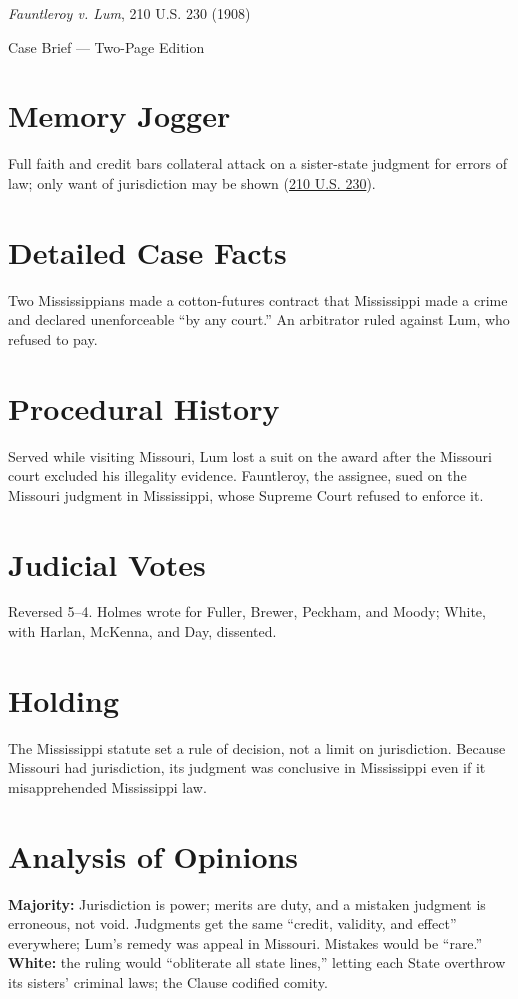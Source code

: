 \documentclass[12pt]{article}
\begin{document}
\begin{center}
{\LARGE \textit{Fauntleroy v. Lum}, 210 U.S. 230 (1908)\par}
\vspace{0.5em}
{\large Case Brief --- Two-Page Edition\par}
\end{center}

\section{Memory Jogger}
Full faith and credit bars collateral attack on a sister-state judgment for errors of law; only want of jurisdiction may be shown (\href{https://supreme.justia.com/cases/federal/us/210/230/}{210 U.S. 230}).

\section{Detailed Case Facts}
Two Mississippians made a cotton-futures contract that Mississippi made a crime and declared unenforceable ``by any court.'' An arbitrator ruled against Lum, who refused to pay.

\section{Procedural History}
Served while visiting Missouri, Lum lost a suit on the award after the Missouri court excluded his illegality evidence. Fauntleroy, the assignee, sued on the Missouri judgment in Mississippi, whose Supreme Court refused to enforce it.

\section{Judicial Votes}
Reversed 5--4. Holmes wrote for Fuller, Brewer, Peckham, and Moody; White, with Harlan, McKenna, and Day, dissented.

\section{Holding}
The Mississippi statute set a rule of decision, not a limit on jurisdiction. Because Missouri had jurisdiction, its judgment was conclusive in Mississippi even if it misapprehended Mississippi law.

\section{Analysis of Opinions}
\textbf{Majority:} Jurisdiction is power; merits are duty, and a mistaken judgment is erroneous, not void. Judgments get the same ``credit, validity, and effect'' everywhere; Lum's remedy was appeal in Missouri. Mistakes would be ``rare.'' \textbf{White:} the ruling would ``obliterate all state lines,'' letting each State overthrow its sisters' criminal laws; the Clause codified comity.
\end{document}
